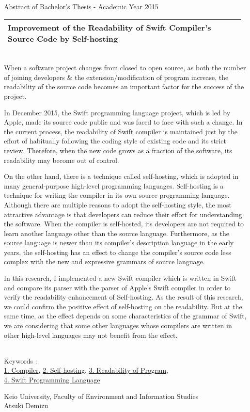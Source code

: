 Abstract of Bachelor's Thesis - Academic Year 2015
\begin{center}
\begin{large}
\begin{tabular}{|p{0.97\linewidth}|}
    \hline
    Improvement of the Readability of Swift Compiler's Source Code by Self-hosting\\
    \hline
\end{tabular}
\end{large}
\end{center}

~ \\

When a software project changes from closed to open source, as both the number of joining developers \& the extension/modification of program increase, the readability of the source code becomes an important factor for the success of the project.

In December 2015, the Swift programming language project, which is led by Apple, made its source code public and was faced to face with such a change.
In the current process, the readability of Swift compiler is maintained just by the effort of habitually following the coding style of existing code and its strict review.
Therefore, when the new code grows as a fraction of the software, its readability may become out of control.

On the other hand, there is a technique called self-hosting, which is adopted in many general-purpose high-level programming languages.
Self-hosting is a technique for writing the compiler in its own source programming language.
Although there are multiple reasons to adopt the self-hosting style, the most attractive advantage is that developers can reduce their effort for understanding the software.
When the compiler is self-hosted, its developers are not required to learn another language other than the source language.
Furthermore, as the source language is newer than its compiler's description language in the early years, the self-hosting has an effect to change the compiler's source code less complex with the new and expressive grammars of source language.

In this research, I implemented a new Swift compiler which is written in Swift and compare its parser with the parser of Apple's Swift compiler in order to verify the readability enhancement of Self-hosting.
As the result of this research, we could confirm the positive effect of self-hosting on the readability.
But at the same time, as the effect depends on some characteristics of the  grammar of Swift, we are considering that some other languages whose compilers are written in other high-level languages may not benefit from the effect.

~ \\
Keywords : \\
\underline{1. Compiler},
\underline{2. Self-hosting},
\underline{3. Readability of Program},\\
\underline{4. Swift Programming Language}
\begin{flushright}
Keio University, Faculty of Environment and Information Studies\\
Atsuki Demizu
\end{flushright}
